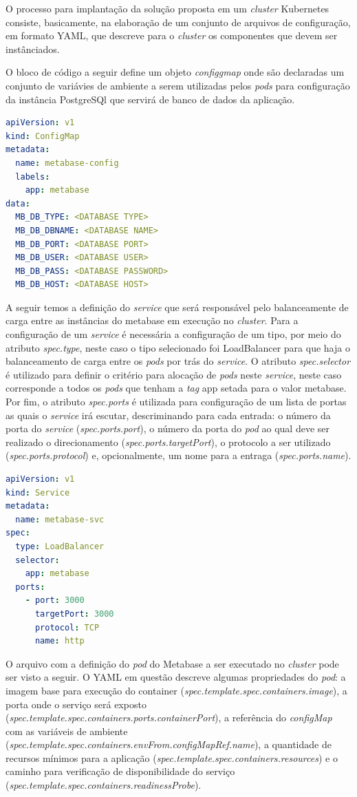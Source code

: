 O processo para implantação da solução proposta em um \textit{cluster} Kubernetes consiste, basicamente, na elaboração de um conjunto de arquivos de configuração, em formato YAML, que descreve para o \textit{cluster} os componentes que devem ser instânciados. 

O bloco de código a seguir define um objeto \textit{configgmap} onde são declaradas um conjunto de variávies de ambiente a serem utilizadas pelos \textit{pods} para configuração da instância PostgreSQl que servirá de banco de dados da aplicação.

\begin{lstlisting}[language=yaml]
apiVersion: v1
kind: ConfigMap
metadata:
  name: metabase-config
  labels:
    app: metabase
data:
  MB_DB_TYPE: <DATABASE TYPE>
  MB_DB_DBNAME: <DATABASE NAME>
  MB_DB_PORT: <DATABASE PORT>
  MB_DB_USER: <DATABASE USER>
  MB_DB_PASS: <DATABASE PASSWORD>
  MB_DB_HOST: <DATABASE HOST>
\end{lstlisting} 

A seguir temos a definição do \textit{service} que será responsável pelo balanceamente de carga entre as instâncias do metabase em execução no \textit{cluster}. Para a configuração de um \textit{service} é necessária a configuração de um tipo, por meio do atributo \textit{spec.type}, neste caso o tipo selecionado foi LoadBalancer para que haja o balanceamento de carga entre os \textit{pods} por trás do \textit{service}. O atributo \textit{spec.selector} é utilizado para definir o critério para alocação de \textit{pods} neste \textit{service}, neste caso corresponde a todos os \textit{pods} que tenham a \textit{tag} app setada para o valor metabase. Por fim, o atributo \textit{spec.ports} é utilizada para configuração de um lista de portas as quais o \textit{service} irá escutar, descriminando para cada entrada: o número da porta do \textit{service} (\textit{spec.ports.port}), o número da porta do \textit{pod} ao qual deve ser realizado o direcionamento (\textit{spec.ports.targetPort}), o protocolo a ser utilizado (\textit{spec.ports.protocol}) e, opcionalmente, um nome para a entraga (\textit{spec.ports.name}). 

\begin{lstlisting}[language=yaml]
apiVersion: v1
kind: Service
metadata:
  name: metabase-svc
spec:
  type: LoadBalancer
  selector:
    app: metabase
  ports:
    - port: 3000
      targetPort: 3000
      protocol: TCP
      name: http
\end{lstlisting} 

O arquivo com a definição do \textit{pod} do Metabase a ser executado no \textit{cluster} pode ser visto a seguir. O YAML em questão descreve algumas propriedades do \textit{pod}: a imagem base para execução do container (\textit{spec.template.spec.containers.image}), a porta onde o serviço será exposto (\textit{spec.template.spec.containers.ports.containerPort}), a referência do \textit{configMap} com as variáveis de ambiente (\textit{spec.template.spec.containers.envFrom.configMapRef.name}), a quantidade de recursos mínimos para a aplicação (\textit{spec.template.spec.containers.resources}) e o caminho para verificação de disponibilidade do serviço (\textit{spec.template.spec.containers.readinessProbe}). 

